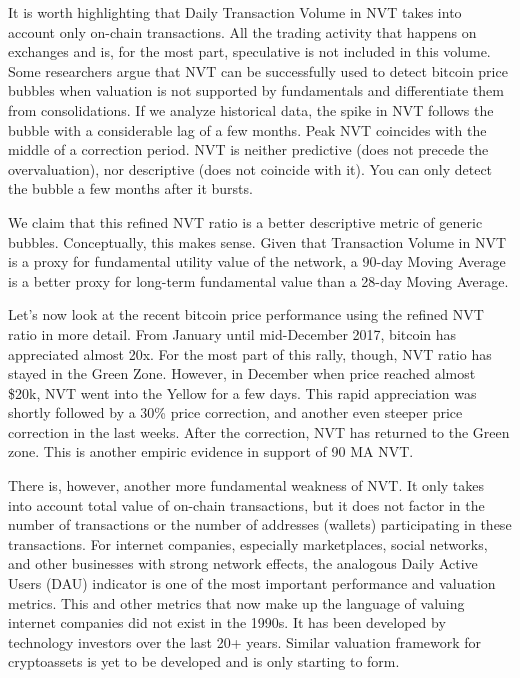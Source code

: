 It is worth highlighting that Daily Transaction Volume in NVT takes into account only on-chain transactions. All the trading activity that happens on exchanges and is, for the most part, speculative is not included in this volume. Some researchers argue that NVT can be successfully used to detect bitcoin price bubbles when valuation is not supported by fundamentals and differentiate them from consolidations. If we analyze historical data, the spike in NVT follows the bubble with a considerable lag of a few months. Peak NVT coincides with the middle of a correction period. NVT is neither predictive (does not precede the overvaluation), nor descriptive (does not coincide with it). You can only detect the bubble a few months after it bursts.

We claim that this refined NVT ratio is a better descriptive metric of generic bubbles. Conceptually, this makes sense. Given that Transaction Volume in NVT is a proxy for fundamental utility value of the network, a 90-day Moving Average is a better proxy for long-term fundamental value than a 28-day Moving Average.

Let’s now look at the recent bitcoin price performance using the refined NVT ratio in more detail. From January until mid-December 2017, bitcoin has appreciated almost 20x. For the most part of this rally, though, NVT ratio has stayed in the Green Zone. However, in December when price reached almost \$20k, NVT went into the Yellow for a few days. This rapid appreciation was shortly followed by a 30\% price correction, and another even steeper price correction in the last weeks. After the correction, NVT has returned to the Green zone. This is another empiric evidence in support of 90 MA NVT.

There is, however, another more fundamental weakness of NVT. It only takes into account total value of on-chain transactions, but it does not factor in the number of transactions or the number of addresses (wallets) participating in these transactions. For internet companies, especially marketplaces, social networks, and other businesses with strong network effects, the analogous Daily Active Users (DAU) indicator is one of the most important performance and valuation metrics. This and other metrics that now make up the language of valuing internet companies did not exist in the 1990s. It has been developed by technology investors over the last 20+ years. Similar valuation framework for cryptoassets is yet to be developed and is only starting to form.


